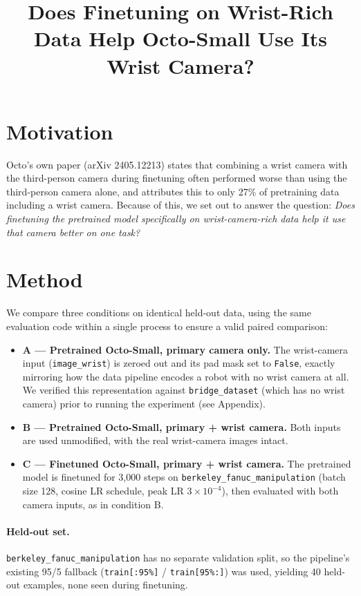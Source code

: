 \documentclass[11pt]{article}
\title{Does Finetuning on Wrist-Rich Data Help Octo-Small Use Its Wrist Camera?}
\author{}
\date{}
\begin{document}
\maketitle

\section*{Motivation}

Octo's own paper (arXiv 2405.12213) states that combining a wrist camera with the third-person camera during finetuning often performed worse than using the third-person camera alone, and attributes this to only 27\% of pretraining data including a wrist camera. Because of this, we set out to answer the question: \emph{Does finetuning the pretrained model specifically on wrist-camera-rich data help it use that camera better on one task?}

\section*{Method}

We compare three conditions on identical held-out data, using the same evaluation code within a single process to ensure a valid paired comparison:

\begin{itemize}
    \item \textbf{A --- Pretrained Octo-Small, primary camera only.} The wrist-camera input (\texttt{image\_wrist}) is zeroed out and its pad mask set to \texttt{False}, exactly mirroring how the data pipeline encodes a robot with no wrist camera at all. We verified this representation against \texttt{bridge\_dataset} (which has no wrist camera) prior to running the experiment (see Appendix).
    \item \textbf{B --- Pretrained Octo-Small, primary + wrist camera.} Both inputs are used unmodified, with the real wrist-camera images intact.
    \item \textbf{C --- Finetuned Octo-Small, primary + wrist camera.} The pretrained model is finetuned for 3,000 steps on \texttt{berkeley\_fanuc\_manipulation} (batch size 128, cosine LR schedule, peak LR $3\times10^{-4}$), then evaluated with both camera inputs, as in condition B.
\end{itemize}

\paragraph{Held-out set.} \texttt{berkeley\_fanuc\_manipulation} has no separate validation split, so the pipeline's existing 95/5 fallback (\texttt{train[:95\%]} / \texttt{train[95\%:]}) was used, yielding 40 held-out examples, none seen during finetuning.
\end{document}
